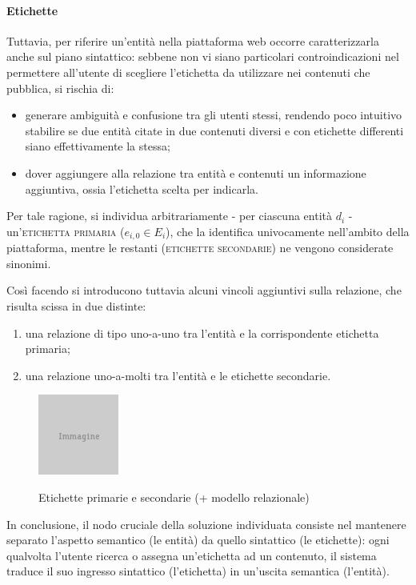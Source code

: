 \paragraph{Etichette}
Tuttavia, per riferire un'entità nella piattaforma web occorre caratterizzarla anche sul piano sintattico: sebbene non vi siano particolari controindicazioni nel permettere all'utente di scegliere l'etichetta da utilizzare nei contenuti che pubblica, si rischia di:
\begin{itemize}
	\item generare ambiguità e confusione tra gli utenti stessi, rendendo poco intuitivo stabilire se due entità citate in due contenuti diversi e con etichette differenti siano effettivamente la stessa;
	\item dover aggiungere alla relazione tra entità e contenuti un informazione aggiuntiva, ossia l'etichetta scelta per indicarla.
\end{itemize}

Per tale ragione, si individua arbitrariamente - per ciascuna entità $d_i$ - un'\textsc{etichetta primaria} ($e_{i,0} \in E_i$), che la identifica univocamente nell'ambito della piattaforma, mentre le restanti (\textsc{etichette secondarie}) ne vengono considerate sinonimi.

Così facendo si introducono tuttavia alcuni vincoli aggiuntivi sulla relazione, che risulta scissa in due distinte:
\begin{enumerate}
	\item una relazione di tipo uno-a-uno tra l'entità e la corrispondente etichetta primaria;
	\item una relazione uno-a-molti tra l'entità e le etichette secondarie.
\end{enumerate}

\begin{figure}[ht]
	\begin{center}
		\includegraphics{placeholder.png}
		\label{fig:tesi:stage:fase-uno:entita-sintassi-semantica}
		\caption{Etichette primarie e secondarie (+ modello relazionale)}
	\end{center}
\end{figure}

In conclusione, il nodo cruciale della soluzione individuata consiste nel mantenere separato l'aspetto semantico (le entità) da quello sintattico (le etichette): ogni qualvolta l'utente ricerca o assegna un'etichetta ad un contenuto, il sistema traduce il suo ingresso sintattico (l'etichetta) in un'uscita semantica (l'entità).

